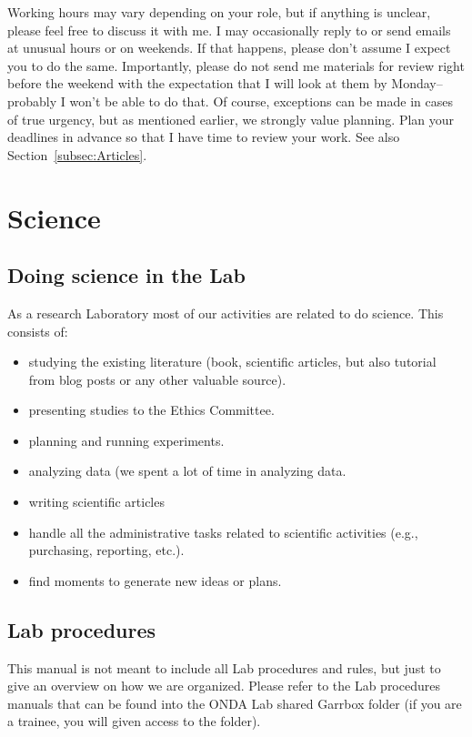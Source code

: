 \documentclass[12pt]{article}
\begin{document}
Working hours may vary depending on your role, but if anything is unclear, please feel free to discuss it with me.
I may occasionally reply to or send emails at unusual hours or on weekends. If that happens, please don't assume I expect you to do the same.
Importantly, please do not send me materials for review right before the weekend with the expectation that I will look at them by Monday--probably I won't be able to do that. Of course, exceptions can be made in cases of true urgency, but as mentioned earlier, we strongly value planning.
Plan your deadlines in advance so that I have time to review your work.  
See also Section~\ref{subsec:Articles}.


\section*{Science}

\subsection{Doing science in the Lab}
As a research Laboratory most of our activities are related to do science. This consists of:
\begin{itemize}
\item studying the existing literature (book, scientific articles, but also tutorial from blog posts or any other valuable source).
\item presenting studies to the Ethics Committee.
\item planning and running experiments.
\item analyzing data (we spent a lot of time in analyzing data.
\item writing scientific articles
\item handle all the administrative tasks related to scientific activities (e.g., purchasing, reporting, etc.).
\item find moments to generate new ideas or plans.
\end{itemize}

\subsection{Lab procedures}
This manual is not meant to include all Lab procedures and rules, but just to give an overview on how we are organized.
Please refer to the Lab procedures manuals that can be found into the ONDA Lab shared Garrbox folder (if you are a trainee, you will given access to the folder).
\end{document}

